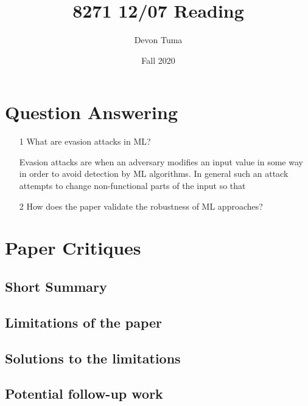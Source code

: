 \documentclass[11pt]{article}
\title{8271 12/07 Reading}
\author{Devon Tuma}
\date{Fall 2020}
\begin{document}
\maketitle

\section*{Question Answering}

\begin{itemize}
\item [1] What are evasion attacks in ML?

  Evasion attacks are when an adversary modifies an input value in some way in order to avoid detection by ML algorithms.
  In general such an attack attempts to change non-functional parts of the input so that 
  
\item [2] How does the paper validate the robustness of ML approaches?
\end{itemize}

\section*{Paper Critiques}

\subsection*{Short Summary}

\subsection*{Limitations of the paper}

\subsection*{Solutions to the limitations}

\subsection*{Potential follow-up work}
\end{document}
